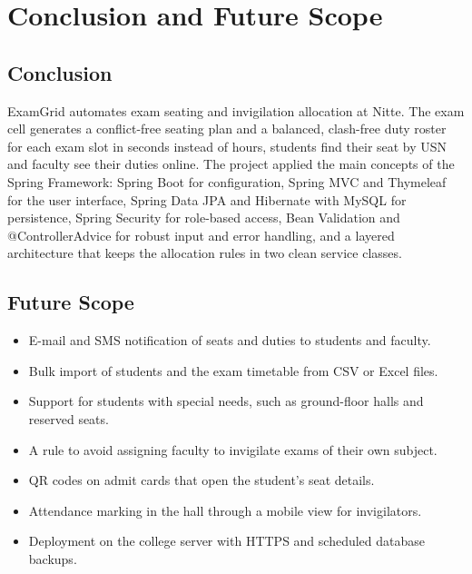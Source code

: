 \documentclass[12pt,letterpaper]{article}
\renewcommand{\texttt}[1]{#1}
\renewcommand{\thesection}{\arabic{section}}
\newcommand{\chapter}[1]{\clearpage\refstepcounter{section}\section*{#1}\label{ch:\thesection}}
\begin{document}
\chapter{Conclusion and Future Scope}
\subsection*{Conclusion}
ExamGrid automates exam seating and invigilation allocation at Nitte. The exam cell generates a conflict-free seating plan and a balanced, clash-free duty roster for each exam slot in seconds instead of hours, students find their seat by USN and faculty see their duties online. The project applied the main concepts of the Spring Framework: Spring Boot for configuration, Spring MVC and Thymeleaf for the user interface, Spring Data JPA and Hibernate with MySQL for persistence, Spring Security for role-based access, Bean Validation and \texttt{@ControllerAdvice} for robust input and error handling, and a layered architecture that keeps the allocation rules in two clean service classes.

\subsection*{Future Scope}
\begin{itemize}
  \item E-mail and SMS notification of seats and duties to students and faculty.
  \item Bulk import of students and the exam timetable from CSV or Excel files.
  \item Support for students with special needs, such as ground-floor halls and reserved seats.
  \item A rule to avoid assigning faculty to invigilate exams of their own subject.
  \item QR codes on admit cards that open the student's seat details.
  \item Attendance marking in the hall through a mobile view for invigilators.
  \item Deployment on the college server with HTTPS and scheduled database backups.
\end{itemize}
\end{document}
